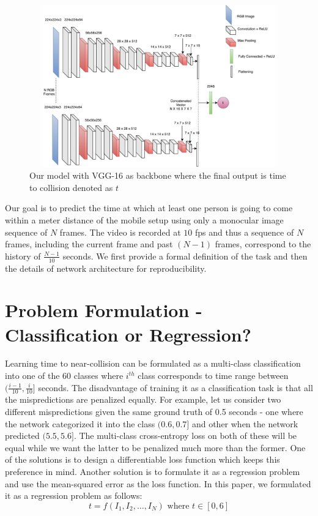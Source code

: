   \begin{figure}[ht]
      \centering
      \includegraphics[height=7.0cm, width=12cm]{figs/vgg_2.pdf}
      \caption{Our model with VGG-16 as backbone where the final output is time to collision denoted as $t$ }
      \label{fig:model}
  \end{figure}

Our goal is to predict the time at which at least one person is going to come within a meter distance of the mobile setup using only a monocular image sequence of $N$ frames. The video is recorded at $10$ fps and thus a sequence of $N$ frames, including the current frame and past $(N-1)$ frames, correspond to the history of $\frac{N-1}{10}$ seconds. We first provide a formal definition of the task and then the details of network architecture for reproducibility.   

\section{Problem Formulation - Classification or Regression?}
Learning time to near-collision can be formulated as a multi-class classification into one of the 60 classes where $i^{th}$ class corresponds to time range between $(\frac{i-1}{10}, \frac{i}{10}]$ seconds. The disadvantage of training it as a classification task is that all the mispredictions are penalized equally. For example, let us consider two different mispredictions given the same ground truth of 0.5 seconds - one where the network categorized it into the class $(0.6, 0.7]$ and other when the network predicted $(5.5, 5.6]$. The multi-class cross-entropy loss on both of these will be equal while we want the latter to be penalized much more than the former. One of the solutions is to design a differentiable loss function which keeps this preference in mind. Another solution is to formulate it as a regression problem and use the mean-squared error as the loss function. In this paper, we formulated it as a regression problem as follows:
$$
t = f(I_{1}, I_{2}, \hdots, I_{N}) \text{ where } t \in [0,6]
$$

